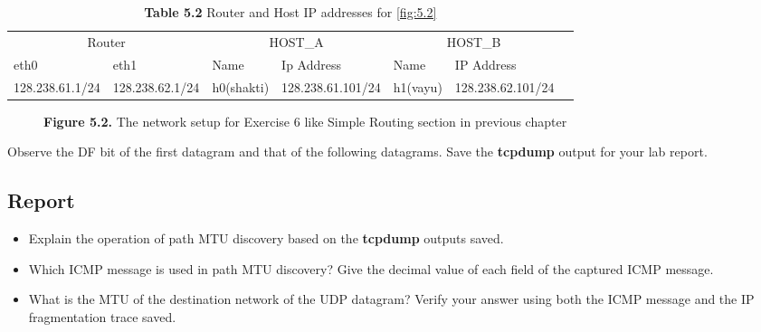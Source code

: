 \documentclass[10pt,a4paper]{article}
\numberwithin{equation}{section}
\numberwithin{figure}{section}
\numberwithin{table}{section}
\begin{document}
	\begin{table}[H]
        \caption{\textbf{Table 5.2} Router and Host IP addresses for \autoref{fig:5.2}}
        \vspace{5pt}
        \centering
        \large
        \begin{tabular}{ *7l }
            \hline \hline
            \multicolumn{2}{c}{Router} & \multicolumn{2}{c}{HOST\_A} & \multicolumn{2}{c}{HOST\_B} \\
            eth0 & eth1 & Name & Ip Address & Name & IP Address \\
            \hline 
            128.238.61.1/24 & 128.238.62.1/24 & h0(shakti) & 128.238.61.101/24 & h1(vayu) & 128.238.62.101/24 \\
            \hline \hline
            \end{tabular}
    \end{table}

    \begin{figure}[H]
        \centering
        \caption{\textbf{Figure 5.2.} The network setup for Exercise 6 like Simple Routing section in previous chapter}
		\label{fig:5.2}
    \end{figure}

	Observe the DF bit of the first datagram and that of the following datagrams. Save the \textbf{tcpdump} output for your lab report.\\

	\subsection*{Report}
	\begin{itemize}
		\item Explain the operation of path MTU discovery based on the \textbf{tcpdump} outputs saved.
		\item Which ICMP message is used in path MTU discovery? Give the decimal value of each field of the captured ICMP message.
		\item What is the MTU of the destination network of the UDP datagram? Verify your answer using both the ICMP message and the IP fragmentation trace saved.
	\end{itemize}
\end{document}
